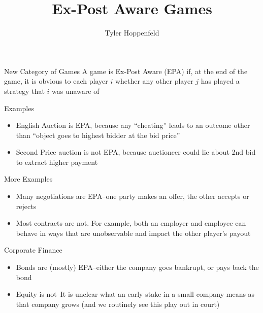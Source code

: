 \documentclass{beamer}
\title{Ex-Post Aware Games}
\author{Tyler Hoppenfeld}
\begin{document}
\begin{frame}[plain]
    \maketitle
\end{frame}


 
 \begin{frame}{New Category of Games}
A game is Ex-Post Aware (EPA) if, at the end of the game, it is obvious to each player $i$ whether any other player $j$ has played a strategy that $i$ was unaware of
 \end{frame}

\begin{frame}{Examples}
	\begin{itemize}
		\item English Auction is EPA, because any ``cheating'' leads to an outcome other than ``object goes to highest bidder at the bid price''
		\item Second Price auction is not EPA, because auctioneer could lie about 2nd bid to extract higher payment
		

	\end{itemize}
\end{frame}

\begin{frame}{More Examples}
	\begin{itemize}
		\item Many negotiations are EPA--one party makes an offer, the other accepts or rejects
		\item Most contracts are not. For example, both an employer and employee can behave in ways that are unobservable and impact the other player’s payout 

	\end{itemize}
\end{frame}


\begin{frame}{Corporate Finance}
	\begin{itemize}
		\item Bonds are (mostly) EPA--either the company goes bankrupt, or pays back the bond
		\item Equity is not--It is unclear what an early stake in a small company means as that company grows (and we routinely see this play out in court)

	\end{itemize}
\end{frame}
\end{document}
